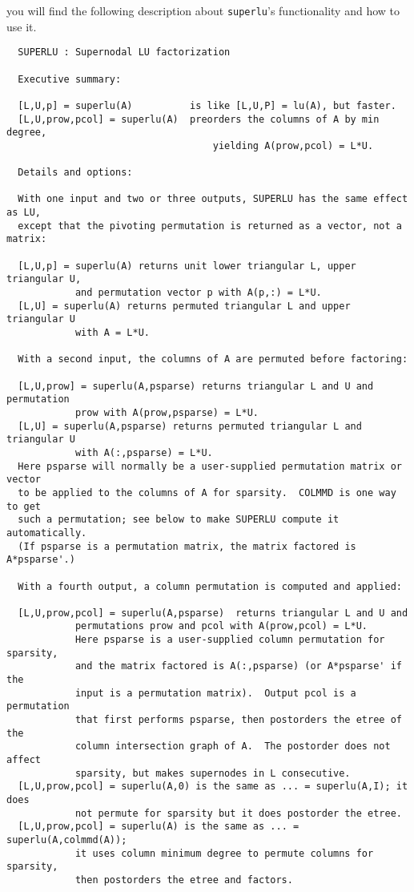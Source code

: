  \hspace{.4in}{\tt help superlu}

\noindent you will find the following description about {\tt superlu}'s
functionality and how to use it.
\begin{verbatim}
  SUPERLU : Supernodal LU factorization
 
  Executive summary:

  [L,U,p] = superlu(A)          is like [L,U,P] = lu(A), but faster.
  [L,U,prow,pcol] = superlu(A)  preorders the columns of A by min degree,
                                    yielding A(prow,pcol) = L*U.

  Details and options:

  With one input and two or three outputs, SUPERLU has the same effect as LU,
  except that the pivoting permutation is returned as a vector, not a matrix:

  [L,U,p] = superlu(A) returns unit lower triangular L, upper triangular U,
            and permutation vector p with A(p,:) = L*U.
  [L,U] = superlu(A) returns permuted triangular L and upper triangular U
            with A = L*U.

  With a second input, the columns of A are permuted before factoring:

  [L,U,prow] = superlu(A,psparse) returns triangular L and U and permutation 
            prow with A(prow,psparse) = L*U.
  [L,U] = superlu(A,psparse) returns permuted triangular L and triangular U 
            with A(:,psparse) = L*U.
  Here psparse will normally be a user-supplied permutation matrix or vector
  to be applied to the columns of A for sparsity.  COLMMD is one way to get
  such a permutation; see below to make SUPERLU compute it automatically.
  (If psparse is a permutation matrix, the matrix factored is A*psparse'.)

  With a fourth output, a column permutation is computed and applied:

  [L,U,prow,pcol] = superlu(A,psparse)  returns triangular L and U and
            permutations prow and pcol with A(prow,pcol) = L*U.
            Here psparse is a user-supplied column permutation for sparsity,
            and the matrix factored is A(:,psparse) (or A*psparse' if the
            input is a permutation matrix).  Output pcol is a permutation
            that first performs psparse, then postorders the etree of the 
            column intersection graph of A.  The postorder does not affect 
            sparsity, but makes supernodes in L consecutive.
  [L,U,prow,pcol] = superlu(A,0) is the same as ... = superlu(A,I); it does
            not permute for sparsity but it does postorder the etree.
  [L,U,prow,pcol] = superlu(A) is the same as ... = superlu(A,colmmd(A));
            it uses column minimum degree to permute columns for sparsity,
            then postorders the etree and factors.
\end{verbatim}



